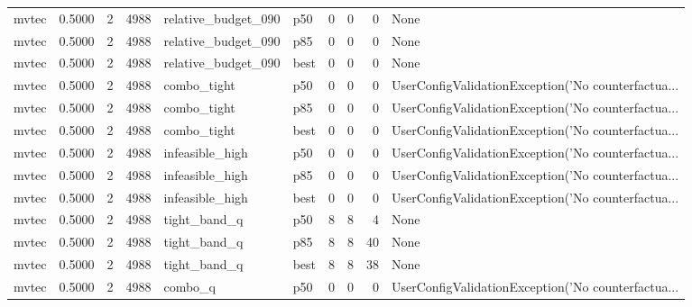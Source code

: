 \begin{tabular}{lrrrllrrrl}
   mvtec &    0.5000 &    2 &   4988 &  relative\_budget\_090 &    p50 &               0 &          0 &       0 &                                               None \\
   mvtec &    0.5000 &    2 &   4988 &  relative\_budget\_090 &    p85 &               0 &          0 &       0 &                                               None \\
   mvtec &    0.5000 &    2 &   4988 &  relative\_budget\_090 &   best &               0 &          0 &       0 &                                               None \\
   mvtec &    0.5000 &    2 &   4988 &          combo\_tight &    p50 &               0 &          0 &       0 & UserConfigValidationException('No counterfactua... \\
   mvtec &    0.5000 &    2 &   4988 &          combo\_tight &    p85 &               0 &          0 &       0 & UserConfigValidationException('No counterfactua... \\
   mvtec &    0.5000 &    2 &   4988 &          combo\_tight &   best &               0 &          0 &       0 & UserConfigValidationException('No counterfactua... \\
   mvtec &    0.5000 &    2 &   4988 &      infeasible\_high &    p50 &               0 &          0 &       0 & UserConfigValidationException('No counterfactua... \\
   mvtec &    0.5000 &    2 &   4988 &      infeasible\_high &    p85 &               0 &          0 &       0 & UserConfigValidationException('No counterfactua... \\
   mvtec &    0.5000 &    2 &   4988 &      infeasible\_high &   best &               0 &          0 &       0 & UserConfigValidationException('No counterfactua... \\
   mvtec &    0.5000 &    2 &   4988 &         tight\_band\_q &    p50 &               8 &          8 &       4 &                                               None \\
   mvtec &    0.5000 &    2 &   4988 &         tight\_band\_q &    p85 &               8 &          8 &      40 &                                               None \\
   mvtec &    0.5000 &    2 &   4988 &         tight\_band\_q &   best &               8 &          8 &      38 &                                               None \\
   mvtec &    0.5000 &    2 &   4988 &              combo\_q &    p50 &               0 &          0 &       0 & UserConfigValidationException('No counterfactua... \\

\end{tabular}
